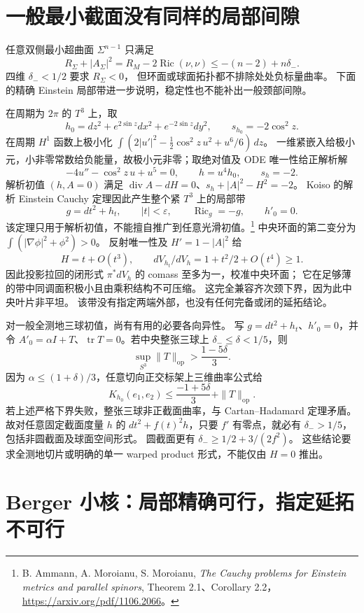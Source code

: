 \documentclass[UTF8,fontset=fandol,zihao=-4,oneside,openany]{ctexbook}
\theoremstyle{cjkplain}
\numberwithin{equation}{chapter}
\DeclareMathOperator{\Ric}{Ric}
\DeclareMathOperator{\tr}{tr}
\begin{document}
\section{一般最小截面没有同样的局部间隙}
\label{FND:analyticcollars}

任意双侧最小超曲面 \(\Sigma^{n-1}\) 只满足
\[
R_\Sigma+|A_\Sigma|^2
=R_M-2\Ric(\nu,\nu)\le-(n-2)+n\delta_-.
\]
四维 \(\delta_-<1/2\) 要求 \(R_\Sigma<0\)，
但环面或球面拓扑都不排除处处负标量曲率。
下面的精确 Einstein 局部带进一步说明，稳定性也不能补出一般颈部间隙。

在周期为 \(2\pi\) 的 \(T^3\) 上，取
\[
h_0=dz^2+e^{2\sin z}dx^2+e^{-2\sin z}dy^2,\qquad s_{h_0}=-2\cos^2z.
\]
在周期 \(H^1\) 函数上极小化
\(\int(2|u'|^2-\tfrac12\cos^2z\,u^2+u^6/6)\,dz\)。
一维紧嵌入给极小元，小非零常数给负能量，故极小元非零；取绝对值及 ODE 唯一性给正解析解
\[
-4u''-\cos^2z\,u+u^5=0,\qquad h=u^4h_0,\qquad s_h=-2.
\]
解析初值 \((h,A=0)\) 满足
\(\operatorname{div}A-dH=0\)、\(s_h+|A|^2-H^2=-2\)。
Koiso 的解析 Einstein Cauchy 定理因此产生整个紧 \(T^3\) 上的局部带
\[
g=dt^2+h_t,\qquad |t|<\varepsilon,\qquad\Ric_g=-g,\qquad h'_0=0.
\]
该定理只用于解析初值，不能擅自推广到任意光滑初值。\footnote{B. Ammann, A. Moroianu, S. Moroianu, \emph{The Cauchy problems for Einstein metrics and parallel spinors}, Theorem 2.1、Corollary 2.2，\url{https://arxiv.org/pdf/1106.2066}。}
中央环面的第二变分为 \(\int(|\nabla\phi|^2+\phi^2)>0\)。
反射唯一性及 \(H'=1-|A|^2\) 给
\[
H=t+O(t^3),\qquad dV_{h_t}/dV_h=1+t^2/2+O(t^4)\ge1.
\]
因此投影拉回的闭形式 \(\pi^*dV_h\) 的 comass 至多为一，校准中央环面；
它在足够薄的带中同调面积极小且由乘积结构不可压缩。
这完全兼容齐次颈下界，因为此中央叶片非平坦。
该带没有指定两端外部，也没有任何完备或闭的延拓结论。

对一般全测地三球初值，尚有有用的必要各向异性。
写 \(g=dt^2+h_t\)、\(h'_0=0\)，并令
\(A'_0=\alpha I+T\)、\(\tr T=0\)。若中央整张三球上 \(\delta_-\le\delta<1/5\)，则
\[
\sup_{S^3}\|T\|_{\mathrm{op}}>\frac{1-5\delta}{3}.
\]
因为 \(\alpha\le(1+\delta)/3\)，任意切向正交标架上三维曲率公式给
\[
K_{h_0}(e_1,e_2)
\le\frac{-1+5\delta}{3}+\|T\|_{\mathrm{op}}.
\]
若上述严格下界失败，整张三球非正截面曲率，与 Cartan--Hadamard 定理矛盾。
故对任意固定截面度量 \(h\) 的 \(dt^2+f(t)^2h\)，只要 \(f'\) 有零点，就必有
\(\delta_->1/5\)，包括非圆截面及球面空间形式。
圆截面更有 \(\delta_-\ge1/2+3/(2f^2)\)。
这些结论要求全测地切片或明确的单一 warped product 形式，不能仅由 \(H=0\) 推出。

\section{Berger 小核：局部精确可行，指定延拓不可行}
\label{FND:berger}
\end{document}
